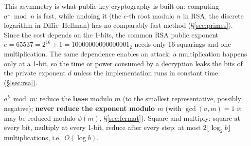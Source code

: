 This asymmetry is what public-key cryptography is built on: computing $a^x \bmod n$ is fast, while undoing it (the $e$-th root modulo $n$ in RSA, the discrete logarithm in Diffie--Hellman) has no comparably fast method (\S\ref{sec:primes}). Since the cost depends on the 1-bits, the common RSA public exponent $e = 65537 = 2^{16} + 1 = 10000000000000001_2$ needs only 16 squarings and one multiplication. The same dependence enables an attack: a multiplication happens only at a 1-bit, so the time or power consumed by a decryption leaks the bits of the private exponent $d$ unless the implementation runs in constant time (\S\ref{sec:rsa}).

\begin{mustknow}
$a^b \bmod m$: reduce the \textbf{base} modulo $m$ (to the smallest representative, possibly negative); \textbf{never reduce the exponent modulo $m$} (with $\gcd(a, m) = 1$ it may be reduced modulo $\phi(m)$, \S\ref{sec:fermat}).
Square-and-multiply: square at every bit, multiply at every 1-bit, reduce after every step; at most $2\lfloor \log_2 b \rfloor$ multiplications, i.e.\ $O(\log b)$.
\end{mustknow}


